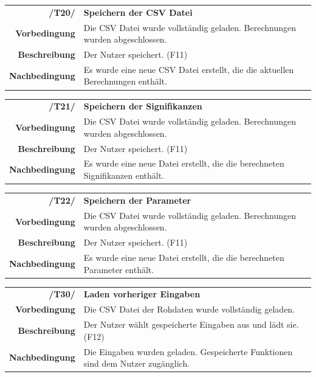 \documentclass{article}
\begin{document}
\begin{table}[H]
\begin{tabularx}{\textwidth}{rX}
\textbf{/T20/}         & \textbf{Speichern der CSV Datei} \\
\textbf{Vorbedingung}  & Die CSV Datei wurde vollständig geladen. Berechnungen wurden abgeschlossen.   \\
\textbf{Beschreibung}  & Der Nutzer speichert. (F11)                                \\
\textbf{Nachbedingung} & Es wurde eine neue CSV Datei erstellt, die die aktuellen Berechnungen enthält.
\end{tabularx}
\end{table}

\begin{table}[H]
\begin{tabularx}{\textwidth}{rX}
\textbf{/T21/}         & \textbf{Speichern der Signifikanzen}  \\
\textbf{Vorbedingung}  & Die CSV Datei wurde vollständig geladen. Berechnungen wurden abgeschlossen.   \\
\textbf{Beschreibung}  & Der Nutzer speichert. (F11)                               \\
\textbf{Nachbedingung} & Es wurde eine neue Datei erstellt, die die berechneten Signifikanzen enthält.
\end{tabularx}
\end{table}

\begin{table}[H]
\begin{tabularx}{\textwidth}{rX}
\textbf{/T22/}         & \textbf{Speichern der Parameter} \\
\textbf{Vorbedingung}  & Die CSV Datei wurde vollständig geladen. Berechnungen wurden abgeschlossen.   \\
\textbf{Beschreibung}  & Der Nutzer speichert. (F11) \\
\textbf{Nachbedingung} & Es wurde eine neue Datei erstellt, die die berechneten Parameter enthält.
\end{tabularx}
\end{table}

\begin{table}[H]
\begin{tabularx}{\textwidth}{rX}
\textbf{/T30/}         & \textbf{Laden vorheriger Eingaben} \\
\textbf{Vorbedingung}  & Die CSV Datei der Rohdaten wurde vollständig geladen.   \\
\textbf{Beschreibung}  & Der Nutzer wählt gespeicherte Eingaben aus und lädt sie. (F12) \\
\textbf{Nachbedingung} & Die Eingaben wurden geladen. Gespeicherte Funktionen sind dem Nutzer zugänglich. 
\end{tabularx}
\end{table}
\end{document}
